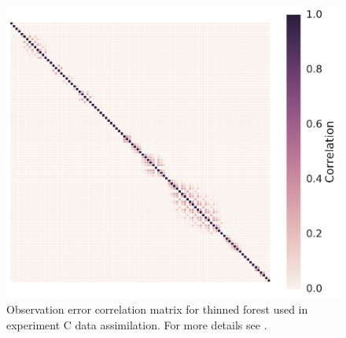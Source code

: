 \begin{figure}[ht]
 \noindent\includegraphics[width=30pc]{chapter/chapter7/rmat_eastc.pdf}
    \caption{Observation error correlation matrix for thinned forest used in experiment C data assimilation. For more details see \citet{Pinnington2016299}.} \label{fig:rmat_ut}
\end{figure}


